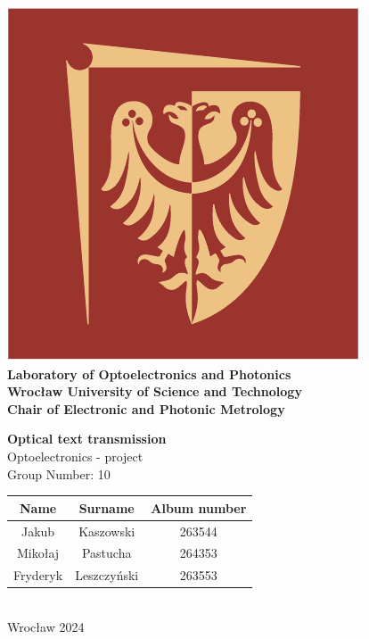 \documentclass[12pt]{article}
\def\thetitle{Optical text transmission}
\begin{document}
	\begin{titlepage}
		\begin{center}
			\includegraphics[scale=0.3]{img/pwr.png}\\
			\vspace{20pt}
			\textbf{Laboratory of Optoelectronics and Photonics} \\
			\textbf{Wrocław University of Science and Technology} \\
			\textbf{Chair of Electronic and Photonic Metrology}
			
			\vspace{20pt}
		
		\textbf{\huge\thetitle} \\
		\vspace{5pt}
		\Large Optoelectronics - project \\
		\vspace{20pt}
		\normalsize
		Group Number: 10\\
		
		\begin{tabular}{ |c|c|c| } 
			\hline
			Name & Surname & Album number \\ \hline
			Jakub & Kaszowski & 263544 \\ \hline
			Mikołaj & Pastucha & 264353 \\  \hline
			Fryderyk & Leszczyński & 263553 \\
			\hline
		\end{tabular} \\
		\vspace{5pt}
		Wrocław 2024 \\

		\end{center}
		
	\end{titlepage}	
  \newpage
	\tableofcontents{\thispagestyle{fancyplain}}
  \newpage
	
\end{document}
